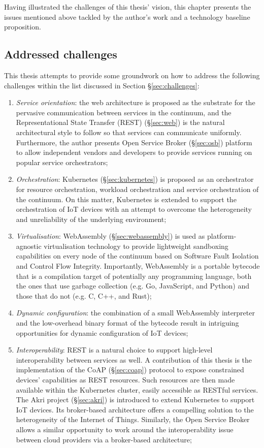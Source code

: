Having illustrated the challenges of this thesis' vision, this chapter presents the issues mentioned above tackled by the author's work and a technology baseline proposition.

\subsection{Addressed challenges}

This thesis attempts to provide some groundwork on how to address the following challenges within the list discussed in Section §\ref{sec:challenges}:

\begin{enumerate}
    \item \emph{Service orientation}: the web architecture is proposed as the substrate for the pervasive communication between services in the continuum, and the Representational State Transfer (REST) (§\ref{sec:web}) is the natural architectural style to follow so that services can communicate uniformly. Furthermore, the author presents Open Service Broker (§\ref{sec:osb}) platform to allow independent vendors and developers to provide services running on popular service orchestrators;
    \item \emph{Orchestration}: Kubernetes (§\ref{sec:kubernetes}) is proposed as an orchestrator for resource orchestration, workload orchestration and service orchestration of the continuum. On this matter, Kubernetes is extended to support the orchestration of IoT devices with an attempt to overcome the heterogeneity and unreliability of the underlying environment;
    \item \emph{Virtualisation}: WebAssembly (§\ref{sec:webassembly}) is used as platform-agnostic virtualisation technology to provide lightweight sandboxing capabilities on every node of the continuum based on Software Fault Isolation and Control Flow Integrity. Importantly, WebAssembly is a portable bytecode that is a compilation target of potentially any programming language, both the ones that use garbage collection (e.g. Go, JavaScript, and Python) and those that do not (e.g. C, C++, and Rust);
    \item \emph{Dynamic configuration}: the combination of a small WebAssembly interpreter and the low-overhead binary format of the bytecode result in intriguing opportunities for dynamic configuration of IoT devices;
    \item \emph{Interoperability}: REST is a natural choice to support high-level interoperability between services as well. A contribution of this thesis is the implementation of the CoAP (§\ref{sec:coap}) protocol to expose constrained devices' capabilities as REST resources. Such resources are then made available within the Kubernetes cluster, easily accessible as RESTful services. The Akri project (§\ref{sec:akri}) is introduced to extend Kubernetes to support IoT devices. Its broker-based architecture offers a compelling solution to the heterogeneity of the Internet of Things. Similarly, the Open Service Broker allows a similar opportunity to work around the interoperability issue between cloud providers via a broker-based architecture;

\end{enumerate}
